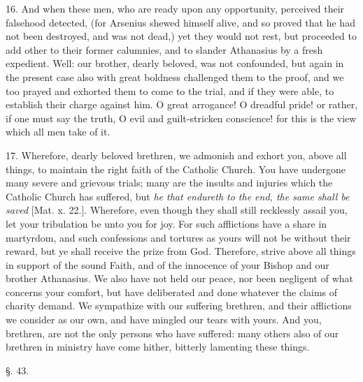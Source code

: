 16. And when these men, who are ready upon any
opportunity, perceived their falsehood detected, (for Arsenius shewed
himself alive, and so proved that he had not been destroyed, and was
not dead,) yet they would not rest, but proceeded to add other to
their former calumnies, and to slander Athanasius by a fresh
expedient. Well: our brother, dearly beloved, was not confounded, but
again in the present case also with great boldness challenged them to
the proof, and we too prayed and exhorted them to come to the trial,
and if they were able, to establish their charge against him. O great
arrogance! O dreadful pride! or rather, if one must say the truth, O
evil and guilt-stricken conscience! for this is the view which all men
take of it.

17. Wherefore, dearly beloved brethren, we
admonish and exhort you, above all things, to maintain the right faith
of the Catholic Church. You have undergone many severe and grievous
trials; many are the insults and injuries which the Catholic Church
has suffered, but \emph{he that endureth to the end, the same shall be
saved} [Mat. x. 22.]. Wherefore, even though they shall still
recklessly assail you, let your tribulation be unto you for joy. For
such afflictions have a share in martyrdom, and such confessions and
tortures as yours will not be without their reward, but ye shall
receive the prize from God. Therefore, strive above all things in
support of the sound Faith, and of the innocence of your Bishop and
our brother Athanasius. We also have not held our peace, nor been
negligent of what concerns your comfort, but have deliberated and done
whatever the claims of charity demand. We sympathize with our
suffering brethren, and their afflictions we consider as our own, and
have mingled our tears with yours. And you, brethren, are not the only
persons who have suffered: many others also of our brethren in
ministry have come hither, bitterly lamenting these things.

§. 43.

